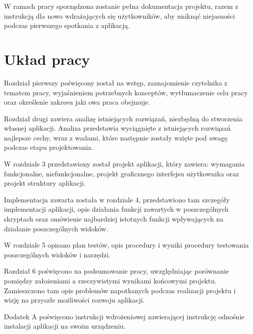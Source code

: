 W ramach pracy sporządzona zostanie pełna dokumentacja projektu, razem z instrukcją dla nowo wdrażających się użytkowników, aby uniknąć niejasności podczas pierwszego spotkania z aplikacją. 


\section{Układ pracy}
Rozdział pierwszy poświęcony został na wstęp, zaznajomienie czytelnika z tematem pracy, wyjaśnieniem potrzebnych konceptów, wytłumaczenie celu pracy oraz określenie zakresu jaki owa praca obejmuje. 

Rozdział drugi zawiera analizę istniejących rozwiązań, niezbędną do stworzenia własnej aplikacji. Analiza przedstawia wyciągnięte z istniejących rozwiązań najlepsze cechy, wraz z wadami, które następnie zostały wzięte pod uwagę podczas etapu projektowania.

W rozdziale 3 przedstawiony został projekt aplikacji, który zawiera: wymagania funkcjonalne, niefunkcjonalne, projekt graficznego interfejsu użytkownika oraz projekt struktury aplikacji.

Implementacja zawarta została w rozdziale 4, przedstawiono tam szczegóły implementacji aplikacji, opis działania funkcji zawartych w poszczególnych skryptach oraz omówienie najbardziej istotnych funkcji wpływających na działanie poszczególnych widoków.

W rozdziale 5 opisano plan testów, opis procedury i wyniki procedury testowania poszczególnych widoków i narzędzi.

Rozdział 6 poświęcono na podsumowanie pracy, uwzględniając porównanie pomiędzy założeniami a rzeczywistymi wynikami końcowymi projektu. Zamieszczono tam opis problemów napotkanych podczas realizacji projektu i wizję na przyszłe możliwości rozwoju aplikacji.

Dodatek A poświęcono instrukcji wdrożeniowej zawierającej instrukcję odnośnie instalacji aplikacji na swoim urządzeniu. 

